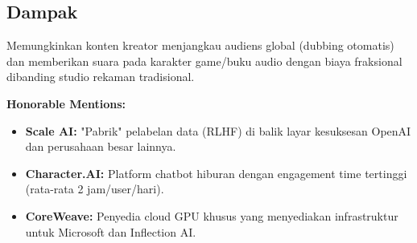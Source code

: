 \subsection*{Dampak}
Memungkinkan konten kreator menjangkau audiens global (dubbing otomatis) dan memberikan suara pada karakter game/buku audio dengan biaya fraksional dibanding studio rekaman tradisional.

\begin{tipbox}
    \textbf{Honorable Mentions:}
    \begin{itemize}
        \item \textbf{Scale AI:} "Pabrik" pelabelan data (RLHF) di balik layar kesuksesan OpenAI dan perusahaan besar lainnya.
        \item \textbf{Character.AI:} Platform chatbot hiburan dengan engagement time tertinggi (rata-rata 2 jam/user/hari).
        \item \textbf{CoreWeave:} Penyedia cloud GPU khusus yang menyediakan infrastruktur untuk Microsoft dan Inflection AI.
    \end{itemize}
\end{tipbox}
